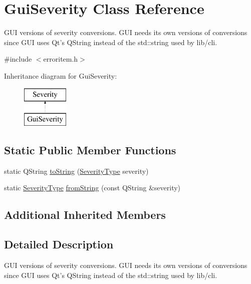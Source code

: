 \hypertarget{class_gui_severity}{\section{Gui\-Severity Class Reference}
\label{class_gui_severity}
}


G\-U\-I versions of severity conversions. G\-U\-I needs its own versions of conversions since G\-U\-I uses Qt's Q\-String instead of the std\-::string used by lib/cli.  




{\ttfamily \#include $<$erroritem.\-h$>$}

Inheritance diagram for Gui\-Severity\-:\begin{figure}[H]
\begin{center}
\leavevmode
\includegraphics[height=2.000000cm]{class_gui_severity}
\end{center}
\end{figure}
\subsection*{Static Public Member Functions}
\begin{DoxyCompactItemize}
\item 
static Q\-String \hyperlink{class_gui_severity_a692445dc8808d0c9058f62a31505c399}{to\-String} (\hyperlink{class_severity_ac185938ae084355bbf1790cf1a70caa6}{Severity\-Type} severity)
\item 
static \hyperlink{class_severity_ac185938ae084355bbf1790cf1a70caa6}{Severity\-Type} \hyperlink{class_gui_severity_a98ad6d362e099bd795a0090090b0f756}{from\-String} (const Q\-String \&severity)
\end{DoxyCompactItemize}
\subsection*{Additional Inherited Members}


\subsection{Detailed Description}
G\-U\-I versions of severity conversions. G\-U\-I needs its own versions of conversions since G\-U\-I uses Qt's Q\-String instead of the std\-::string used by lib/cli. 

